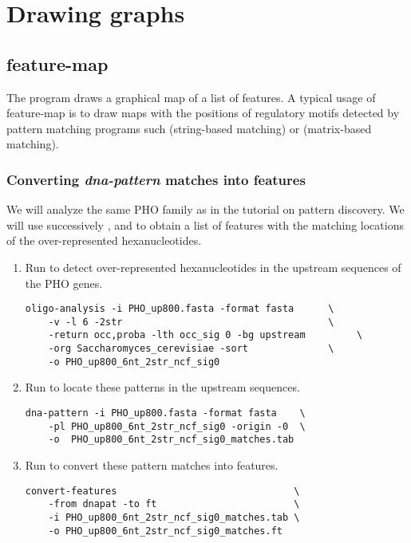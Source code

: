 
\section{Drawing graphs}


\subsection{feature-map}

The program  draws a graphical map of a list of
features. A typical usage of feature-map is to draw maps with the
positions of regulatory motifs detected by pattern matching programs
such  (string-based matching) or 
(matrix-based matching).

\subsubsection{Converting \textit{dna-pattern} matches into features}

We will analyze the same PHO family as in the tutorial on pattern
discovery. We will use successively ,
 and  to obtain a
list of features with the matching locations of the over-represented
hexanucleotides.

\begin{enumerate}

\item Run  to detect over-represented 
hexanucleotides in the upstream sequences of the PHO
genes.

\begin{verbatim} 
oligo-analysis -i PHO_up800.fasta -format fasta      \
    -v -l 6 -2str                                    \
    -return occ,proba -lth occ_sig 0 -bg upstream         \
    -org Saccharomyces_cerevisiae -sort              \
    -o PHO_up800_6nt_2str_ncf_sig0 
\end{verbatim}

\item Run \program{dna-pattern} to locate these patterns in 
the upstream sequences.

\begin{verbatim} 
dna-pattern -i PHO_up800.fasta -format fasta    \
    -pl PHO_up800_6nt_2str_ncf_sig0 -origin -0  \
    -o  PHO_up800_6nt_2str_ncf_sig0_matches.tab
\end{verbatim}

\item Run  to convert these pattern matches
  into features.

\begin{verbatim}
convert-features                               \
    -from dnapat -to ft                        \
    -i PHO_up800_6nt_2str_ncf_sig0_matches.tab \
    -o PHO_up800_6nt_2str_ncf_sig0_matches.ft 
\end{verbatim}

\end{enumerate}

